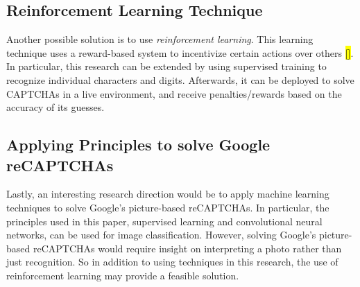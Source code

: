 \documentclass[11pt,conference]{IEEEtran}
\begin{document}
\subsection{Reinforcement Learning Technique}
Another possible solution is to use \emph{reinforcement learning}. This learning technique uses a reward-based
system to incentivize certain actions over others \hl{[]}. In particular, this research
can be extended by using supervised training to recognize individual
characters and digits. Afterwards, it can be deployed to solve CAPTCHAs in a
live environment, and receive penalties/rewards based on the accuracy of its
guesses.

\subsection{Applying Principles to solve Google reCAPTCHAs}
Lastly, an interesting research direction would be to apply machine learning
techniques to solve Google's picture-based reCAPTCHAs. In particular, the
principles used in this paper, supervised learning and convolutional neural
networks, can be used for image classification. However, solving Google's picture-based
reCAPTCHAs would require insight on interpreting a photo
rather than just recognition. So in addition to using techniques in this
research, the use of reinforcement learning may provide a feasible solution.
\end{document}
